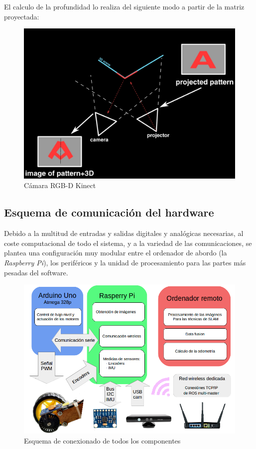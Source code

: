 \newpage
El calculo de la profundidad lo realiza del siguiente modo a partir de la matriz proyectada:
\begin{figure}[h!]
	\centering
	\includegraphics[width=.7\textwidth]{images/kinect_teo}
	\caption{Cámara RGB-D Kinect}
\end{figure}

\subsection{Esquema de comunicación del hardware}
Debido a la multitud de entradas y salidas digitales y analógicas necesarias, al coste computacional de todo el sistema, y a la variedad de las comunicaciones, se plantea una configuración muy modular 
entre el ordenador de abordo (la \textit{Raspberry Pi}), los periféricos y la unidad de procesamiento para las partes más pesadas del software.\\
  \begin{figure}[h!]
  	\centering
  	\includegraphics[width=.7\textwidth]{images/hw/wheele_esquema}
  	\caption{Esquema de conexionado de todos los componentes}
  \end{figure}